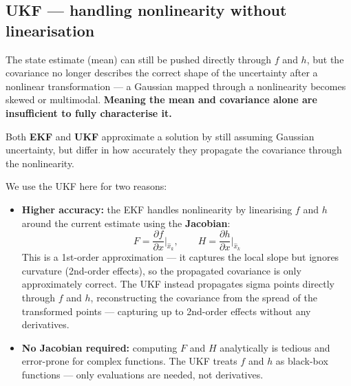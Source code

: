 \documentclass[12pt, a4paper]{article}
\begin{document}
\subsection*{UKF --- handling nonlinearity without linearisation}
\vspace{-0.2cm}
The state estimate (mean) can still be pushed directly through $f$ and $h$,
but the covariance no longer describes the correct shape of the uncertainty
after a nonlinear transformation --- a Gaussian mapped through a nonlinearity
becomes skewed or multimodal.
\textbf{Meaning the mean and covariance alone are insufficient to fully characterise it.}

Both \textbf{EKF} and \textbf{UKF} approximate a solution by still
assuming Gaussian uncertainty, but differ in how accurately they propagate
the covariance through the nonlinearity.

We use the UKF here for two reasons:
\begin{itemize}[leftmargin=1.4em]
  \item \textbf{Higher accuracy:} the EKF handles nonlinearity by linearising
        $f$ and $h$ around the current estimate using the \textbf{Jacobian}:
        \[
          F = \frac{\partial f}{\partial x}\bigg|_{\hat{x}_k}, \qquad
          H = \frac{\partial h}{\partial x}\bigg|_{\hat{x}_k}
        \]
        This is a 1st-order approximation --- it captures the local slope but
        ignores curvature (2nd-order effects), so the propagated covariance
        is only approximately correct.
        The UKF instead propagates sigma points directly through $f$ and $h$,
        reconstructing the covariance from the spread of the transformed points
        --- capturing up to 2nd-order effects without any derivatives.

  \item \textbf{No Jacobian required:} computing $F$ and $H$ analytically is
        tedious and error-prone for complex functions. The UKF treats $f$ and
        $h$ as black-box functions --- only evaluations are needed, not derivatives.
\end{itemize}
\end{document}
